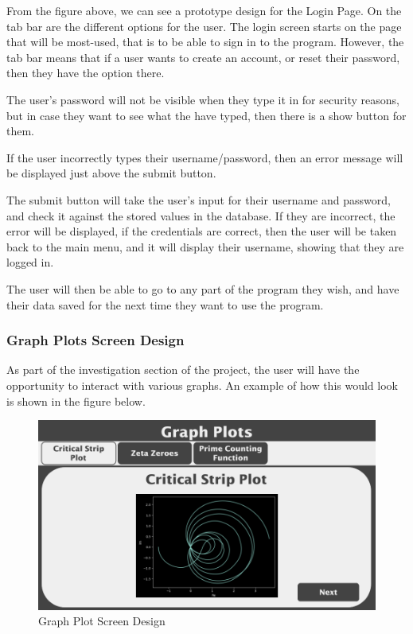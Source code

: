 \documentclass{article}
\begin{document}
From the figure above, we can see a prototype design for the Login Page.
On the tab bar are the different options for the user. The login screen starts on the page that will be most-used, that is to be able to sign in to the program. However, the tab bar means that if a user wants to create an account, or reset their password, then they have the option there.

The user's password will not be visible when they type it in for security reasons, but in case they want to see what the have typed, then there is a show button for them.

If the user incorrectly types their username/password, then an error message will be displayed just above the submit button.

The submit button will take the user's input for their username and password, and check it against the stored values in the database. If they are incorrect, the error will be displayed, if the credentials are correct, then the user will be taken back to the main menu, and it will display their username, showing that they are logged in.

The user will then be able to go to any part of the program they wish, and have their data saved for the next time they want to use the program.

\clearpage

\subsubsection{Graph Plots Screen Design}

As part of the investigation section of the project, the user will have the opportunity to interact with various graphs. An example of how this would look is shown in the figure below.

\begin{figure}[ht]
    \centering
    \includegraphics[scale=0.18]{graph-plots-screen-design}
    \caption{Graph Plot Screen Design}
\end{figure}
\end{document}

